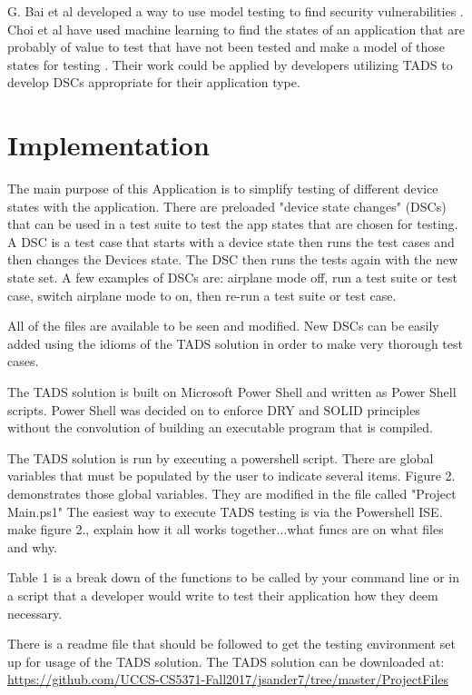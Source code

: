 G. Bai et al developed a way to use model testing to find security vulnerabilities \cite{7911333}.  Choi et al have used machine learning to find the states of an application that are probably of value to test that have not been tested and make a model of those states for testing \cite{Choi:2013:GGT:2544173.2509552}.  Their work could be applied by developers utilizing TADS to develop DSCs appropriate for their application type.


\section{Implementation}
The main purpose of this Application is to simplify testing of different device states with the application.  There are preloaded "device state changes" (DSCs) that can be used in a test suite to test the app states that are chosen for testing.  A DSC is a test case that starts with a device state then runs the test cases and then changes the Devices state.  The DSC then runs the tests again with the new state set.  A few examples of DSCs are: airplane mode off, run a test suite or test case, switch airplane mode to on, then re-run a test suite or test case.

All of the files are available to be seen and modified.  New DSCs can be easily added using the idioms of the TADS solution in order to make very thorough test cases.

The TADS solution is built on Microsoft Power Shell and written as Power Shell scripts.  Power Shell was decided on to enforce DRY and SOLID principles without the convolution of building an executable program that is compiled.

The TADS solution is run by executing a powershell script.  There are global variables that must be populated by the user to indicate several items.  Figure 2. demonstrates those global variables.  They are modified in the file called "Project Main.ps1"  The easiest way to execute TADS testing is via the Powershell ISE. 
make figure 2., explain how it all works together...what funcs are on what files and why.

Table 1 is a break down of the functions to be called by your command line or in a script that a developer would write to test their application how they deem necessary.  

There is a readme file that should be followed to get the testing environment set up for usage of the TADS solution.  The TADS solution can be downloaded at: \url{https://github.com/UCCS-CS5371-Fall2017/jsander7/tree/master/ProjectFiles} \\

